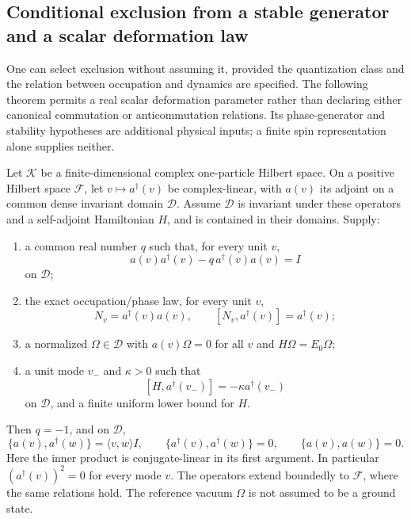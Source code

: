 \subsection{Conditional exclusion from a stable generator and a scalar deformation law}
\label{sec:pauli-stability-selection}

One can select exclusion without assuming it, provided the quantization
class and the relation between occupation and dynamics are specified.
The following theorem permits a real scalar deformation parameter rather
than declaring either canonical commutation or anticommutation relations.
Its phase-generator and stability hypotheses are additional physical
inputs; a finite spin representation alone supplies neither.

\begin{theorem}
\label{thm:pauli-stability-selection}
Let $\mathcal K$ be a finite-dimensional complex one-particle Hilbert
space. On a positive Hilbert space $\mathcal F$, let
$v\mapsto a^\dagger(v)$ be complex-linear, with
$a(v)$ its adjoint on a common dense invariant domain $\mathcal D$.
Assume $\mathcal D$ is invariant under these operators and a self-adjoint
Hamiltonian $H$, and is contained in their domains. Supply:
\begin{enumerate}
 \item a common real number $q$ such that, for every unit $v$,
 \[
  a(v)a^\dagger(v)-q\,a^\dagger(v)a(v)=I
 \]
 on $\mathcal D$;
 \item the exact occupation/phase law, for every unit $v$,
 \[
  N_v=a^\dagger(v)a(v),\qquad [N_v,a^\dagger(v)]=a^\dagger(v);
 \]
 \item a normalized $\Omega\in\mathcal D$ with
 $a(v)\Omega=0$ for all $v$ and $H\Omega=E_0\Omega$;
 \item a unit mode $v_-$ and $\kappa>0$ such that
 \[
  [H,a^\dagger(v_-)]=-\kappa a^\dagger(v_-)
 \]
 on $\mathcal D$, and a finite uniform lower bound for $H$.
\end{enumerate}
Then $q=-1$, and on $\mathcal D$,
\[
 \{a(v),a^\dagger(w)\}=\langle v,w\rangle I,
 \qquad \{a^\dagger(v),a^\dagger(w)\}=0,
 \qquad \{a(v),a(w)\}=0.
\]
Here the inner product is conjugate-linear in its first argument. In
particular $(a^\dagger(v))^2=0$ for every mode $v$. The operators extend
boundedly to $\mathcal F$, where the same relations hold.
The reference vacuum $\Omega$ is not assumed to be a ground state.
\end{theorem}
